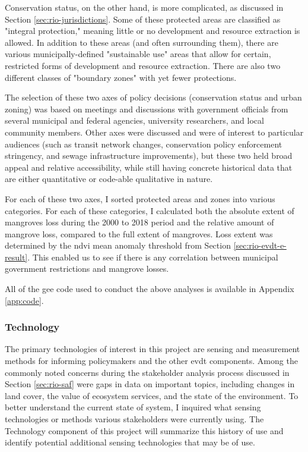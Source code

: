 Conservation status, on the other hand, is more complicated, as discussed in Section \ref{sec:rio-jurisdictions}. Some of these protected areas are classified as "integral protection," meaning little or no development and resource extraction is allowed. In addition to these areas (and often surrounding them), there are various municipally-defined "sustainable use" areas that allow for certain, restricted forms of development and resource extraction. There are also two different classes of "boundary zones" with yet fewer protections.

The selection of these two axes of policy decisions (conservation status and urban zoning) was based on meetings and discussions with government officials from several municipal and federal agencies, university researchers, and local community members. Other axes were discussed and were of interest to particular audiences (such as transit network changes, conservation policy enforcement stringency, and sewage infrastructure improvements), but these two held broad appeal and relative accessibility, while still having concrete historical data that are either quantitative or code-able qualitative in nature. 

For each of these two axes, I sorted protected areas and zones into various categories. For each of these categories, I calculated both the absolute extent of mangroves loss during the 2000 to 2018 period and the relative amount of mangrove loss, compared to the full extent of mangroves. Loss extent was determined by the \ac{ndvi} mean anomaly threshold from Section \ref{sec:rio-evdt-e-result}. This enabled us to see if there is any correlation between municipal government restrictions and mangrove losses.

All of the \ac{gee} code used to conduct the above analyses is available in Appendix \ref{app:code}.

\subsubsection{Technology}

The primary technologies of interest in this project are sensing and measurement methods for informing policymakers and the other \ac{evdt} components. Among the commonly noted concerns during the stakeholder analysis process discussed in Section \ref{sec:rio-saf} were gaps in data on important topics, including changes in land cover, the value of ecosystem services, and the state of the environment. To better understand the current state of system, I inquired what sensing technologies or methods various stakeholders were currently using. The Technology component of this project will summarize this history of use and identify potential additional sensing technologies that may be of use. 


